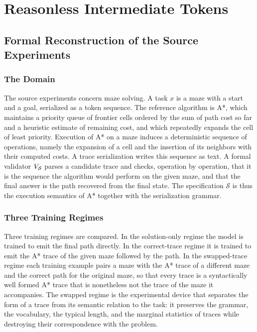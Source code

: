 \part{Reasonless Intermediate Tokens}
\label{part:tokens}

\chapter{Formal Reconstruction of the Source Experiments}
\label{ch:valmeekam}

\section{The Domain}

The source experiments \cite{valmeekam2026} concern maze solving. A task $x$ is a maze with a start and a goal, serialized as a token sequence. The reference algorithm is A*, which maintains a priority queue of frontier cells ordered by the sum of path cost so far and a heuristic estimate of remaining cost, and which repeatedly expands the cell of least priority. Execution of A* on a maze induces a deterministic sequence of operations, namely the expansion of a cell and the insertion of its neighbors with their computed costs. A trace serialization writes this sequence as text. A formal validator $V_{\mathcal S}$ parses a candidate trace and checks, operation by operation, that it is the sequence the algorithm would perform on the given maze, and that the final answer is the path recovered from the final state. The specification $\mathcal S$ is thus the execution semantics of A* together with the serialization grammar.

\section{Three Training Regimes}

Three training regimes are compared. In the solution-only regime the model is trained to emit the final path directly. In the correct-trace regime it is trained to emit the A* trace of the given maze followed by the path. In the swapped-trace regime each training example pairs a maze with the A* trace of a different maze and the correct path for the original maze, so that every trace is a syntactically well formed A* trace that is nonetheless not the trace of the maze it accompanies. The swapped regime is the experimental device that separates the form of a trace from its semantic relation to the task: it preserves the grammar, the vocabulary, the typical length, and the marginal statistics of traces while destroying their correspondence with the problem.

